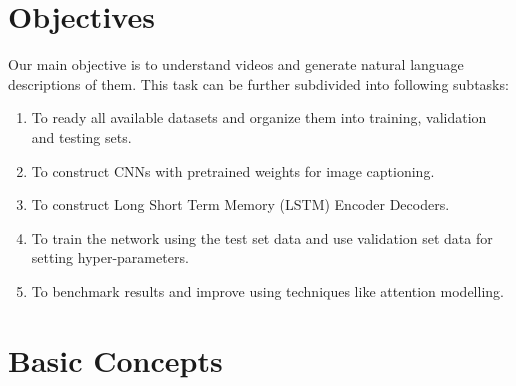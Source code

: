 \documentclass{article}
\begin{document}
	\section{Objectives}
		Our main objective is to understand videos and generate natural language descriptions of them. This task can be further subdivided into following subtasks:
		\begin{enumerate}
			\item
				To ready all available datasets and organize them into training, validation and testing sets.
			\item
				To construct CNNs with pretrained weights for image captioning.
			\item
				To construct Long Short Term Memory (LSTM) Encoder Decoders.
			\item
				To train the network using the test set data and use validation set data for setting hyper-parameters.
			\item
				To benchmark results and improve using techniques like attention modelling.
		\end{enumerate}		 

\section{Basic Concepts} 
\end{document}
